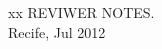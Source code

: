 \begin{center}
  {\color{white} xx}\vfill
  REVIWER NOTES.\\
  Recife, Jul 2012
\end{center}
\newpage 
